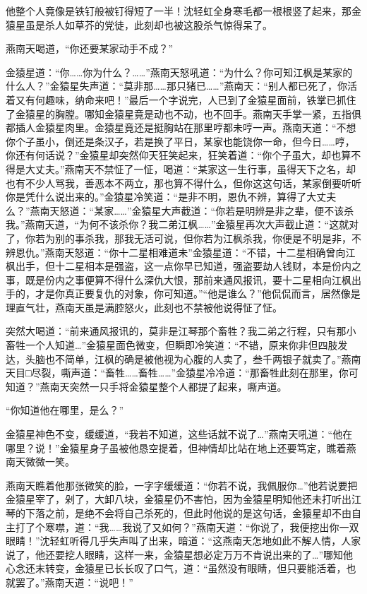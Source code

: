 \documentclass[12pt,oneside]{book}
\begin{document}
他整个人竟像是铁钉般被钉得短了一半！沈轻虹全身寒毛都一根根竖了起来，那金猿星虽是杀人如草芥的党徒，此刻却也被这股杀气惊得呆了。

燕南天喝道，``你还要某家动手不成？''

金猿星道：``你\ldots\ldots 你为什么？\ldots\ldots{}''燕南天怒吼道：``为什么？你可知江枫是某家的什么人？''金猿星失声道：``莫非那\ldots\ldots 那只猪已\ldots\ldots{}''燕南天：``别人都已死了，你活着又有何趣味，纳命来吧！''最后一个字说完，人已到了金猿星面前，铁掌已抓住了金猿星的胸膛。哪知金猿星竟是动也不动，也不回手。燕南天手掌一紧，五指俱都插人金猿星肉里。金猿星竟还是挺胸站在那里哼都未哼一声。燕南天道：``不想你个子虽小，倒还是条汉子，若是换了平日，某家也能饶你一命，但今日\ldots\ldots 哼，你还有何话说？''金猿星却突然仰天狂笑起来，狂笑着道：``你个子虽大，却也算不得是大丈夫。''燕南天不禁怔了一怔，喝道：``某家这一生行事，虽得天下之名，却也有不少人骂我，善恶本不两立，那也算不得什么，但你这这句话，某家倒要听听你是凭什么说出来的。''金猿星冷笑道：``是非不明，恩仇不辨，算得了大丈夫么？''燕南天怒道：``某家\ldots\ldots{}''金猿星大声截道：``你若是明辨是非之辈，便不该杀我。''燕南天道，``为何不该杀你？我二弟江枫\ldots\ldots{}''金猿星再次大声截止道：``这就对了，你若为别的事杀我，那我无活可说，但你若为江枫杀我，你便是不明是非，不辨恩仇。''燕南天怒道：``你十二星相难道未''金猿星道：``不错，十二星相确曾向江枫出手，但十二星相本是强盗，这一点你早已知道，强盗要劫人钱财，本是份内之事，既是份内之事便算不得什么深仇大恨，那前来通风报讯，要十二星相向江枫出手的，才是你真正要复仇的对象，你可知道。''``他是谁么？''他侃侃而言，居然像是理直气壮，燕南天虽是满腔怒火，此刻也不禁被他说得怔了怔。

突然大喝道：``前来通风报讯的，莫非是江琴那个畜牲？我二弟之行程，只有那小畜牲一个人知道\ldots{}''金猿星面色微变，但瞬即冷笑道：``不错，原来你非但四肢发达，头脑也不简单，江枫的确是被他视为心腹的人卖了，叁千两银子就卖了。''燕南天目□尽裂，嘶声道：``畜牲\ldots\ldots 畜牲\ldots\ldots{}''金猿星冷冷道：``那畜牲此刻在那里，你可知道？''燕南天突然一只手将金猿星整个人都提了起来，嘶声道。

``你知道他在哪里，是么？''

金猿星神色不变，缓缓道，``我若不知道，这些话就不说了\ldots{}''燕南天吼道：``他在哪里？说！''金猿星身子虽被他恳空提着，但神情却比站在地上还要笃定，瞧着燕南天微微一笑。

燕南天瞧着他那张微笑的脸，一字字缓缓道：``你若不说，我佩服你\ldots{}''他若说要把金猿星宰了，剁了，大卸八块，金猿星仍不害怕，因为金猿星明知他还未打听出江琴的下落之前，是绝不会将自己杀死的，但此时他说的是这句话，金猿星却不由自主打了个寒噤，道：``我\ldots\ldots 我说了又如何？''燕南天道：``你说了，我便挖出你一双眼睛！''沈轻虹听得几乎失声叫了出来，暗道：``这燕南天怎地如此不解人情，人家说了，他还要挖人眼睛，这样一来，金猿星想必定万万不肯说出来的了\ldots{}''哪知他心念还末转变，金猿星已长长叹了口气，道：``虽然没有眼睛，但只要能活着，也就罢了。''燕南天道：``说吧！''
\end{document}
